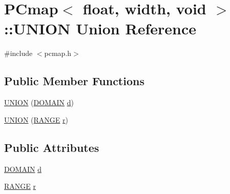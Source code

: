 \hypertarget{union_p_cmap_3_01float_00_01width_00_01void_01_4_1_1_u_n_i_o_n}{}\section{P\+Cmap$<$ float, width, void $>$\+:\+:U\+N\+I\+O\+N Union Reference}
\label{union_p_cmap_3_01float_00_01width_00_01void_01_4_1_1_u_n_i_o_n}


{\ttfamily \#include $<$pcmap.\+h$>$}

\subsection*{Public Member Functions}
\begin{DoxyCompactItemize}
\item 
\hyperlink{union_p_cmap_3_01float_00_01width_00_01void_01_4_1_1_u_n_i_o_n_a49e43c7f14025ad91be276230f85426c}{U\+N\+I\+O\+N} (\hyperlink{struct_p_cmap_3_01float_00_01width_00_01void_01_4_a0d5674e8d0baa55f3da9200f872fb69f}{D\+O\+M\+A\+I\+N} \hyperlink{union_p_cmap_3_01float_00_01width_00_01void_01_4_1_1_u_n_i_o_n_a0f44d484ea280730e7c04922e7f260b6}{d})
\item 
\hyperlink{union_p_cmap_3_01float_00_01width_00_01void_01_4_1_1_u_n_i_o_n_aba9b002fb8b3fb74da10e7f37f799e21}{U\+N\+I\+O\+N} (\hyperlink{struct_p_cmap_3_01float_00_01width_00_01void_01_4_a7f454607f3a289956d80e866ca3218ba}{R\+A\+N\+G\+E} \hyperlink{union_p_cmap_3_01float_00_01width_00_01void_01_4_1_1_u_n_i_o_n_a8380935472ed21db197fcfd9de45db41}{r})
\end{DoxyCompactItemize}
\subsection*{Public Attributes}
\begin{DoxyCompactItemize}
\item 
\hyperlink{struct_p_cmap_3_01float_00_01width_00_01void_01_4_a0d5674e8d0baa55f3da9200f872fb69f}{D\+O\+M\+A\+I\+N} \hyperlink{union_p_cmap_3_01float_00_01width_00_01void_01_4_1_1_u_n_i_o_n_a0f44d484ea280730e7c04922e7f260b6}{d}
\item 
\hyperlink{struct_p_cmap_3_01float_00_01width_00_01void_01_4_a7f454607f3a289956d80e866ca3218ba}{R\+A\+N\+G\+E} \hyperlink{union_p_cmap_3_01float_00_01width_00_01void_01_4_1_1_u_n_i_o_n_a8380935472ed21db197fcfd9de45db41}{r}
\end{DoxyCompactItemize}



